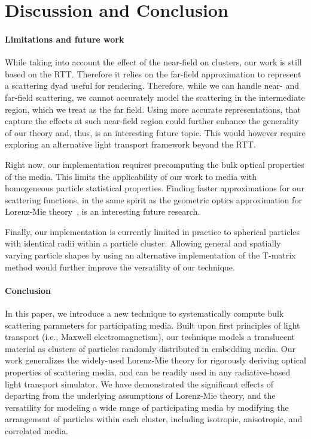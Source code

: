 \section{Discussion and Conclusion}
\label{sec:conclusion}
%
\paragraph{Limitations and future work}
While taking into account the effect of the near-field on clusters, our work is still based on the RTT. Therefore it relies on the far-field approximation to represent a scattering dyad useful for rendering. Therefore, while we can handle near- and far-field scattering, we cannot accurately model the scattering in the intermediate region, which we treat as the far field. Using more accurate representations, that capture the effects at such near-field region could further enhance the generality of our theory and, thus, is an interesting future topic. This would however require exploring an alternative light transport framework beyond the RTT.

Right now, our implementation requires precomputing the bulk optical properties of the media. This limits the applicability of our work to media with homogeneous particle statistical properties. Finding faster approximations for our scattering functions, in the same spirit as the geometric optics approximation for Lorenz-Mie theory~\cite{glantschnig1981light}, is an interesting future research. 

Finally, our implementation is currently limited in practice to spherical particles with identical radii within a particle cluster. Allowing general and spatially varying particle shapes by using an alternative implementation of the T-matrix method would further improve the versatility of our technique.

\paragraph{Conclusion}
In this paper, we introduce a new technique to systematically compute bulk scattering parameters for participating media. Built upon first principles of light transport (i.e., Maxwell electromagnetism), our technique models a translucent material as clusters of particles randomly distributed in embedding media. Our work generalizes the widely-used Lorenz-Mie theory for rigorously deriving optical properties of scattering media, and can be readily used in any radiative-based light transport simulator. 
%
We have demonstrated the significant effects of departing from the underlying assumptions of Lorenz-Mie theory, and the versatility for modeling a wide range of participating media by modifying the arrangement of particles within each cluster, including isotropic, anisotropic, and correlated media.



